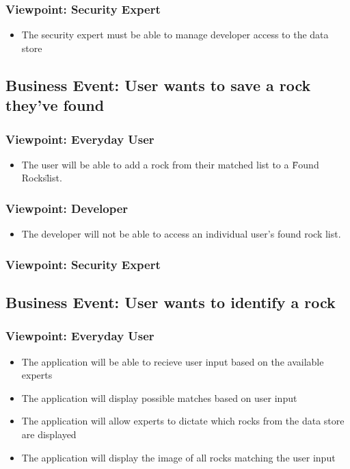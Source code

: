 \documentclass[titlepage]{article}
\begin{document}
  \subsubsection {Viewpoint: Security Expert}
    \begin{itemize}
      \item The security expert must be able to manage developer access to the data store
    \end{itemize}
\subsection {Business Event: User wants to save a rock they've found}
  \subsubsection {Viewpoint: Everyday User}
    \begin{itemize}
      \item The user will be able to add a rock from their matched list to a \"Found Rocks\" list.
    \end{itemize}
  \subsubsection {Viewpoint: Developer}
    \begin{itemize}
      \item The developer will not be able to access an individual user's found rock list.
    \end{itemize}
  \subsubsection {Viewpoint: Security Expert}
\subsection{Business Event: User wants to identify a rock}
  \subsubsection {Viewpoint: Everyday User}
    \begin{itemize}
      \item The application will be able to recieve user input based on the available experts
      \item The application will display possible matches based on user input
      \item The application will allow experts to dictate which rocks from the data store are displayed
      \item The application will display the image of all rocks matching the user input
    \end{itemize}
\end{document}
